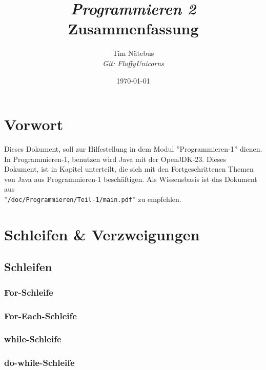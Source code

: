 \documentclass[12pt, a4paper]{article}
\title{
    \textit{Programmieren 2} \\
        \large Zusammenfassung
}
\author{
    Tim Nätebus \\
    \large \textit{Git: FluffyUnicorns}
}
\date{\today}
\begin{document}
\maketitle
\newpage
{\hypersetup{linkcolor=black}
\tableofcontents
}
\newpage
\section*{Vorwort}
Dieses Dokument, soll zur Hilfestellung in dem Modul ''Programmieren-1'' dienen.
In Programmieren-1, benutzen wird Java mit der OpenJDK-23.
Dieses Dokument, ist in Kapitel unterteilt, die sich mit den Fortgeschrittenen Themen von Java aus Programmieren-1 beschäftigen. 
Als Wissensbasis ist das Dokument aus \\''\texttt{/doc/Programmieren/Teil-1/main.pdf}'' zu empfehlen.
\section*{Schleifen \& Verzweigungen}
\subsection*{Schleifen}

\subsubsection*{For-Schleife}
\subsubsection*{For-Each-Schleife}

\subsubsection*{while-Schleife}

\subsubsection*{do-while-Schleife}
\end{document}
